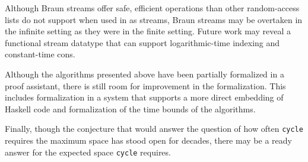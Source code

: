 \documentclass[envcountsect]{llncs}
\begin{document}
Although Braun streams offer safe, efficient operations than other random-access lists do not support when used in as streams, Braun streams may be overtaken in the infinite setting as they were in the finite setting.
Future work may reveal a functional stream datatype that can support logarithmic-time indexing and constant-time cons.

Although the algorithms presented above have been partially formalized in a proof assistant, there is still room for improvement in the formalization.
This includes formalization in a system that supports a more direct embedding of Haskell code and formalization of the time bounds of the algorithms.

Finally, though the conjecture that would answer the question of how often {\tt cycle} requires the maximum space has stood open for decades, there may be a ready answer for the expected space {\tt cycle} requires.

\begin{comment}
Is there a data structure that provides terminating constant-time \verb|cons|?

Also good for finite Braun trees, because can get index i in time $i$, not $n+i$

Formalizing in a language with extraction

Formalizing time and space complexity

complete formalization

average case space complexity of cycle
\end{comment}



\end{document}
